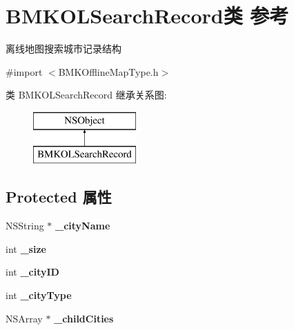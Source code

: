 \hypertarget{interface_b_m_k_o_l_search_record}{}\section{B\+M\+K\+O\+L\+Search\+Record类 参考}
\label{interface_b_m_k_o_l_search_record}


离线地图搜索城市记录结构  




{\ttfamily \#import $<$B\+M\+K\+Offline\+Map\+Type.\+h$>$}

类 B\+M\+K\+O\+L\+Search\+Record 继承关系图\+:\begin{figure}[H]
\begin{center}
\leavevmode
\includegraphics[height=2.000000cm]{interface_b_m_k_o_l_search_record}
\end{center}
\end{figure}
\subsection*{Protected 属性}
\begin{DoxyCompactItemize}
\item 
\hypertarget{interface_b_m_k_o_l_search_record_abb283493e35764e63a41766d40f9f016}{}N\+S\+String $\ast$ {\bfseries \+\_\+city\+Name}\label{interface_b_m_k_o_l_search_record_abb283493e35764e63a41766d40f9f016}

\item 
\hypertarget{interface_b_m_k_o_l_search_record_a16e88995e8c282f3aa7a1dc72cdc9580}{}int {\bfseries \+\_\+size}\label{interface_b_m_k_o_l_search_record_a16e88995e8c282f3aa7a1dc72cdc9580}

\item 
\hypertarget{interface_b_m_k_o_l_search_record_a9ed9011244b41c5360e7d9bd010d7e53}{}int {\bfseries \+\_\+city\+I\+D}\label{interface_b_m_k_o_l_search_record_a9ed9011244b41c5360e7d9bd010d7e53}

\item 
\hypertarget{interface_b_m_k_o_l_search_record_abda23ccbf5aa6fe33911d76a268f013d}{}int {\bfseries \+\_\+city\+Type}\label{interface_b_m_k_o_l_search_record_abda23ccbf5aa6fe33911d76a268f013d}

\item 
\hypertarget{interface_b_m_k_o_l_search_record_a0e6d2797e93de33955702cf362f6ab08}{}N\+S\+Array $\ast$ {\bfseries \+\_\+child\+Cities}\label{interface_b_m_k_o_l_search_record_a0e6d2797e93de33955702cf362f6ab08}

\end{DoxyCompactItemize}
